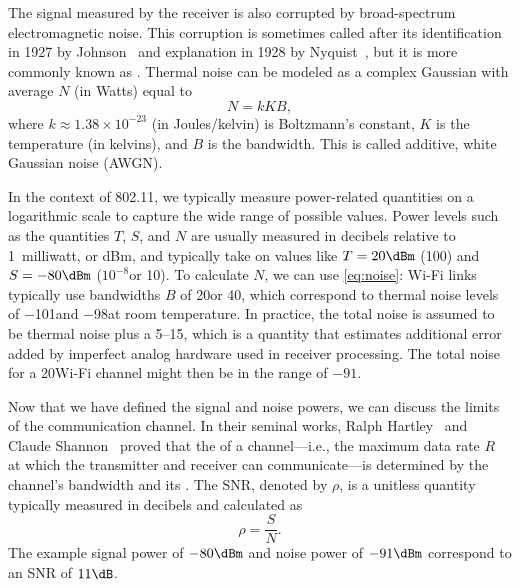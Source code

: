 The signal measured by the receiver is also corrupted by broad-spectrum electromagnetic noise. This corruption is sometimes called  after its identification in 1927 by Johnson~\cite{Johnson_noise} and explanation in 1928 by Nyquist~\cite{Nyquist_noise}, but it is more commonly known as . Thermal noise can be modeled as a complex Gaussian with average  $N$ (in Watts) equal to
\begin{equation}
\label{eq:noise}
N = kKB,
\end{equation}
where $k\approx1.38\times10^{-23}$ (in Joules/kelvin) is Boltzmann's constant, $K$ is the temperature (in kelvins), and $B$ is the bandwidth. This is called additive, white Gaussian noise (AWGN).

In the context of 802.11, we typically measure power-related quantities on a logarithmic scale to capture the wide range of possible values. Power levels such as the quantities $T$, $S$, and $N$ are usually measured in decibels relative to 1~milliwatt, or dBm, and typically take on values like $T=20\dBm$ (100\mW) and $S=-80\dBm$ ($10^{-8}$\mW or 10\pW). To calculate $N$, we can use \eqref{eq:noise}: Wi-Fi links typically use bandwidths $B$ of 20\MHz or 40\MHz, which correspond to thermal noise levels of $-$101\dBm and $-$98\dBm at room temperature. In practice, the total noise is assumed to be thermal noise plus a 5\dB--15\dB {}, which is a quantity that estimates additional error added by imperfect analog hardware used in receiver processing. The total noise for a 20\MHz Wi-Fi channel might then be in the range of $-91$\dBm.

Now that we have defined the signal and noise powers, we can discuss the limits of the communication channel. In their seminal works, Ralph Hartley~\cite{Hartley_law} and Claude Shannon~\cite{Shannon_coding,Shannon_capacity} proved that the  of a channel---i.e., the maximum data rate $R$ at which the transmitter and receiver can communicate---is determined by the channel's bandwidth and its . The SNR, denoted by $\rho$, is a unitless quantity typically measured in decibels and calculated as
\begin{equation}
\rho = \frac{S}{N}.
\end{equation}
The example signal power of $-80\dBm$ and noise power of $-91\dBm$ correspond to an SNR of $11\dB$.


